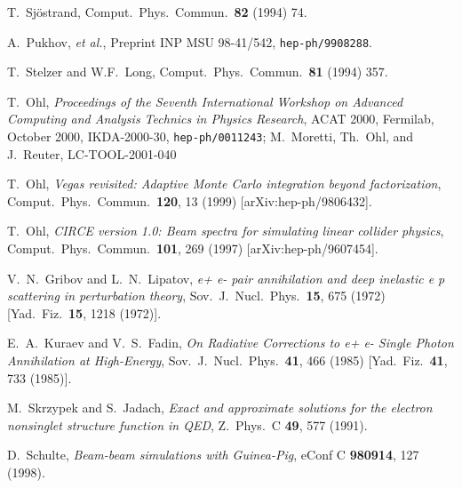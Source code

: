 \documentclass[12pt]{book}
\newcommand{\ttt}[1]{\texttt{#1}}
\begin{document}
\begin{thebibliography}{19}

  T.~Sj\"ostrand,
  Comput.\ Phys.\ Commun.\ \textbf{82} (1994) 74.

  A.~Pukhov, \emph{et al.},
  Preprint INP MSU 98-41/542, \ttt{hep-ph/9908288}.

  T.~Stelzer and W.F.~Long,
  Comput.\ Phys.\ Commun.\ \textbf{81} (1994) 357.

  T.~Ohl,
  \emph{Proceedings of the Seventh International Workshop on
  Advanced Computing and Analysis Technics in Physics Research},
  ACAT 2000, Fermilab, October 2000,
  IKDA-2000-30, \ttt{hep-ph/0011243};
  M.~Moretti, Th.~Ohl, and J.~Reuter,
  LC-TOOL-2001-040

  T.~Ohl,
  {\em Vegas revisited: Adaptive Monte Carlo integration beyond
    factorization},
  Comput.\ Phys.\ Commun.\  {\bf 120}, 13 (1999)
  [arXiv:hep-ph/9806432].

  T.~Ohl,
  {\em CIRCE version 1.0: Beam spectra for simulating linear collider
    physics},
  Comput.\ Phys.\ Commun.\  {\bf 101}, 269 (1997)
  [arXiv:hep-ph/9607454].

  V.~N.~Gribov and L.~N.~Lipatov,
  {\em e+ e- pair annihilation and deep inelastic e p scattering in
    perturbation theory},
  Sov.\ J.\ Nucl.\ Phys.\  {\bf 15}, 675 (1972)
  [Yad.\ Fiz.\  {\bf 15}, 1218 (1972)].

  E.~A.~Kuraev and V.~S.~Fadin,
  {\em On Radiative Corrections to e+ e- Single Photon Annihilation at
    High-Energy},
  Sov.\ J.\ Nucl.\ Phys.\  {\bf 41}, 466 (1985)
  [Yad.\ Fiz.\  {\bf 41}, 733 (1985)].

  M.~Skrzypek and S.~Jadach,
  {\em Exact and approximate solutions for the electron nonsinglet
    structure function in QED},
  Z.\ Phys.\ C {\bf 49}, 577 (1991).

  D.~Schulte,
  {\em Beam-beam simulations with Guinea-Pig},
  eConf C {\bf 980914}, 127 (1998).


\end{thebibliography}
\end{document}
